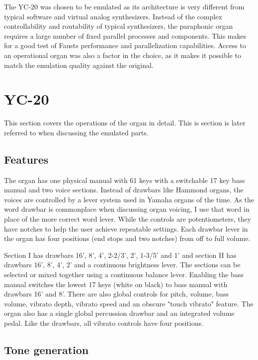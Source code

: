 \documentclass[11pt,a4paper]{article}
\begin{document}
The YC-20 was chosen to be emulated as its architecture is very different from typical software and virtual analog synthesizers. Instead of the complex controllability and routability of typical synthesizers, the paraphonic organ requires a large number of fixed parallel processes and components. This makes for a good test of Fausts performance and parallelization capabilities. Access to an operational organ was also a factor in the choice, as it makes it possible to match the emulation quality against the original. 

\section{YC-20}
\label{section:yc-20}

This section covers the operations of the organ in detail\cite{yamaha:yc20}. This is section is later referred to when discussing the emulated parts.

\subsection{Features}

The organ has one physical manual with 61 keys with a switchable 17 key bass manual and two voice sections. Instead of drawbars like Hammond organs, the voices are controlled by a lever system used in Yamaha organs of the time. As the word drawbar is commonplace when discussing organ voicing, I use that word in place of the more correct word lever. While the controls are potentiometers, they have notches to help the user achieve repeatable settings. Each drawbar lever in the organ has four positions (end stops and two notches) from off to full volume. 

Section I has drawbars 16', 8', 4', 2-2/3', 2', 1-3/5' and 1' and section II has drawbars 16', 8', 4', 2' and a continuous brightness lever. The sections can be selected or mixed together using a continuous balance lever. Enabling the bass manual switches the lowest 17 keys (white on black) to bass manual with drawbars 16' and 8'. There are also global controls for pitch, volume, bass volume, vibrato depth, vibrato speed and an obscure "touch vibrato" feature. The organ also has a single global percussion drawbar and an integrated volume pedal. Like the drawbars, all vibrato controls have four positions.

\subsection{Tone generation}
\end{document}
